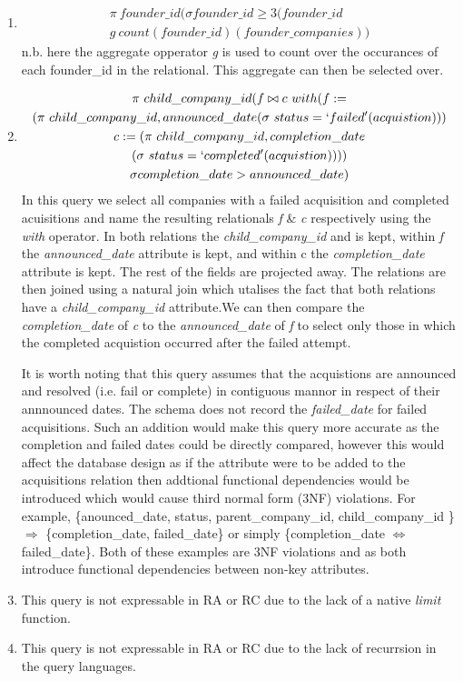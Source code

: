 \documentclass[12pt]{article}
\begin{document}
\begin{enumerate}
  \item\label{part1}\begin{multline*} \pi \ founder\_id (\sigma founder\_id \geq 3 (founder\_id \ \\
  g \ count (founder\_id) (founder\_companies))
 \end{multline*}
 n.b. here the aggregate opperator \emph{g} is used to count over the occurances of each founder\_id in the relational. This aggregate can then be selected over.
  \item\label{part1}\begin{multline*}
  \pi \ child\_company\_id (f \bowtie c \ with (f := \\
  (\pi \ child\_company\_id, announced\_date (\sigma \ status = `failed' (acquistion))) \\
  c := (\pi \ child\_company\_id, completion\_date \\
  (\sigma \ status = `completed' (acquistion)))
  ) \\
  \sigma completion\_date > announced\_date)
 \end{multline*}
 In this query we select all companies with a failed acquisition and completed acuisitions and name the resulting relationals \emph{f} \& \emph{c} respectively using the \emph{with} operator. In both relations the \emph{child\_company\_id} and is kept, within \emph{f} the \emph{announced\_date} attribute is kept, and within {c} the \emph{completion\_date} attribute is kept. The rest of the fields are projected away. The relations are then joined using a natural join which utalises the fact that both relations have a \emph{child\_company\_id} attribute.We can then compare the \emph{completion\_date} of \emph{c} to the \emph{announced\_date} of \emph{f} to select only those in which the completed acquistion occurred after the failed attempt.

 It is worth noting that this query assumes that the acquistions are announced and resolved (i.e. fail or complete) in contiguous mannor in respect of their annnounced dates. The schema does not record the \emph {failed\_date} for failed acquisitions. Such an addition would make this query more accurate as the completion and failed dates could be directly compared, however this would affect the database design as if the attribute were to be added to the acquisitions relation then addtional functional dependencies would be introduced which would cause third normal form (3NF) violations. For example, \{{anounced\_date, status, parent\_company\_id, child\_company\_id }\} $\Rightarrow$ \{{completion\_date, failed\_date}\} or simply \{{completion\_date $\Leftrightarrow$ failed\_date}\}. Both of these examples are 3NF violations and as both introduce functional dependencies between non-key attributes.

  \item\label{part1} This query is not expressable in RA or RC due to the lack of a native \emph{limit} function.
  \item\label{part1} This query is not expressable in RA or RC due to the lack of recurrsion in the query languages.
  \end{enumerate}
\end{document}
